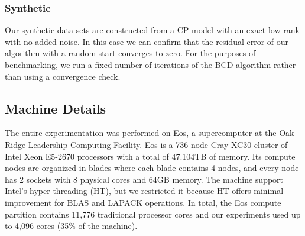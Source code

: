 \subsubsection{Synthetic}
Our synthetic data sets are constructed from a CP model with an exact low rank with no added noise.
In this case we can confirm that the residual error of our algorithm with a random start converges to zero.
For the purposes of benchmarking, we run a fixed number of iterations of the BCD algorithm rather than using a convergence check.


\subsection{Machine Details}
The entire experimentation was performed on Eos, a supercomputer at the Oak Ridge Leadership Computing Facility. 
Eos is a 736-node Cray XC30 cluster of Intel Xeon E5-2670 processors with a total of 47.104TB of memory. 
Its compute nodes are organized in blades where each blade contains 4 nodes, and every node has 2 sockets with 8 physical cores and 64GB memory. 
The machine support Intel's hyper-threading (HT), but we restricted it because HT offers minimal improvement for BLAS and LAPACK operations. 
In total, the Eos compute partition contains 11,776 traditional processor cores and our experiments used up to 4,096 cores (35\% of the machine). 

